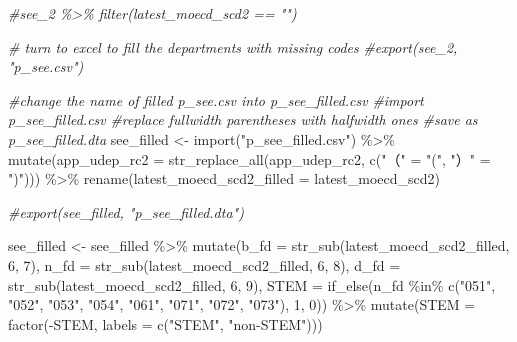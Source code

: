\documentclass[
]{article}
\newenvironment{Shaded}{\begin{snugshade}}{\end{snugshade}}
\newcommand{\AttributeTok}[1]{\textcolor[rgb]{0.77,0.63,0.00}{#1}}
\newcommand{\CommentTok}[1]{\textcolor[rgb]{0.56,0.35,0.01}{\textit{#1}}}
\newcommand{\DecValTok}[1]{\textcolor[rgb]{0.00,0.00,0.81}{#1}}
\newcommand{\FunctionTok}[1]{\textcolor[rgb]{0.00,0.00,0.00}{#1}}
\newcommand{\NormalTok}[1]{#1}
\newcommand{\OtherTok}[1]{\textcolor[rgb]{0.56,0.35,0.01}{#1}}
\newcommand{\SpecialCharTok}[1]{\textcolor[rgb]{0.00,0.00,0.00}{#1}}
\newcommand{\StringTok}[1]{\textcolor[rgb]{0.31,0.60,0.02}{#1}}
\begin{document}
\begin{Shaded}
\begin{Highlighting}[]
\CommentTok{\#see\_2 \%\textgreater{}\% filter(latest\_moecd\_scd2 == "")}

\CommentTok{\# turn to excel to fill the departments with missing codes }
\CommentTok{\#export(see\_2, "p\_see.csv")}

\CommentTok{\#change the name of filled p\_see.csv into p\_see\_filled.csv}
\CommentTok{\#import p\_see\_filled.csv}
\CommentTok{\#replace fullwidth parentheses with halfwidth ones}
\CommentTok{\#save as p\_see\_filled.dta}
\NormalTok{see\_filled }\OtherTok{\textless{}{-}} \FunctionTok{import}\NormalTok{(}\StringTok{"p\_see\_filled.csv"}\NormalTok{) }\SpecialCharTok{\%\textgreater{}\%} 
  \FunctionTok{mutate}\NormalTok{(}\AttributeTok{app\_udep\_rc2 =} \FunctionTok{str\_replace\_all}\NormalTok{(app\_udep\_rc2, }
                                        \FunctionTok{c}\NormalTok{(}\StringTok{"（"} \OtherTok{=} \StringTok{"("}\NormalTok{, }\StringTok{"）"} \OtherTok{=} \StringTok{")"}\NormalTok{))) }\SpecialCharTok{\%\textgreater{}\%}
  \FunctionTok{rename}\NormalTok{(}\AttributeTok{latest\_moecd\_scd2\_filled =}\NormalTok{ latest\_moecd\_scd2)}

\CommentTok{\#export(see\_filled, "p\_see\_filled.dta")}

\NormalTok{see\_filled }\OtherTok{\textless{}{-}}\NormalTok{ see\_filled }\SpecialCharTok{\%\textgreater{}\%} 
  \FunctionTok{mutate}\NormalTok{(}\AttributeTok{b\_fd =} \FunctionTok{str\_sub}\NormalTok{(latest\_moecd\_scd2\_filled, }\DecValTok{6}\NormalTok{, }\DecValTok{7}\NormalTok{),}
         \AttributeTok{n\_fd =} \FunctionTok{str\_sub}\NormalTok{(latest\_moecd\_scd2\_filled, }\DecValTok{6}\NormalTok{, }\DecValTok{8}\NormalTok{),}
         \AttributeTok{d\_fd =} \FunctionTok{str\_sub}\NormalTok{(latest\_moecd\_scd2\_filled, }\DecValTok{6}\NormalTok{, }\DecValTok{9}\NormalTok{),}
         \AttributeTok{STEM =} \FunctionTok{if\_else}\NormalTok{(n\_fd }\SpecialCharTok{\%in\%} \FunctionTok{c}\NormalTok{(}\StringTok{"051"}\NormalTok{, }\StringTok{"052"}\NormalTok{, }\StringTok{"053"}\NormalTok{, }\StringTok{"054"}\NormalTok{, }\StringTok{"061"}\NormalTok{, }\StringTok{"071"}\NormalTok{, }\StringTok{"072"}\NormalTok{, }\StringTok{"073"}\NormalTok{), }\DecValTok{1}\NormalTok{, }\DecValTok{0}\NormalTok{)) }\SpecialCharTok{\%\textgreater{}\%}
  \FunctionTok{mutate}\NormalTok{(}\AttributeTok{STEM =} \FunctionTok{factor}\NormalTok{(}\SpecialCharTok{{-}}\NormalTok{STEM, }\AttributeTok{labels =} \FunctionTok{c}\NormalTok{(}\StringTok{"STEM"}\NormalTok{, }\StringTok{"non{-}STEM"}\NormalTok{)))}
\end{Highlighting}
\end{Shaded}
\end{document}
